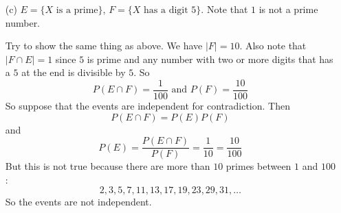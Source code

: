 \documentclass{article}
\begin{document}
\begin{itemize}
        \item [(c)] $E = \{X \text{ is a prime}\}$, $F = \{X \text{ has a digit } 5\}$. Note that $1$ is not a prime number. 
            \begin{answer}
                Try to show the same thing as above. We have $\lvert F \rvert = 10$. Also note that $\lvert F \cap E \rvert = 1$ since $5$ is prime and any number with two or more digits that has a $5$ at the end is divisible by $5$. So 
                    \begin{equation*}
                        P(E \cap F) = \dfrac{1}{100} \text{ and } P(F) = \dfrac{10}{100}
                    \end{equation*}
                So suppose that the events are independent for contradiction. Then
                    \begin{equation*}
                        P(E \cap F) = P(E)P(F)
                    \end{equation*}
                and
                    \begin{equation*}
                        P(E) = \dfrac{P(E \cap F)}{P(F)} = \dfrac{1}{10} = \dfrac{10}{100}
                    \end{equation*}
                But this is not true because there are more than $10$ primes between $1$ and $100$:
                    \begin{equation*}
                        2, 3, 5, 7, 11, 13, 17, 19, 23, 29, 31, \ldots
                    \end{equation*}
                So the events are not independent.
            \end{answer}
    \end{itemize}
\end{document}

